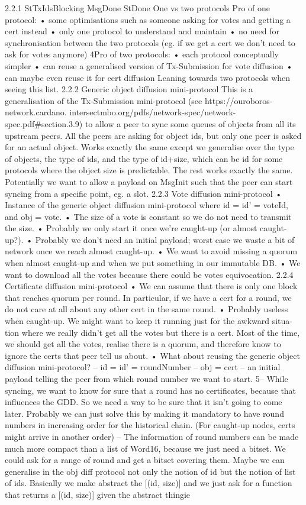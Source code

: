 2.2.1
StTxIdsBlocking
MsgDone
StDone
One vs two protocols
Pro of one protocol:
• some optimisations such as someone asking for votes and getting a cert instead
• only one protocol to understand and maintain
• no need for synchronisation between the two protocols (eg. if we get a cert we don’t need to ask
for votes anymore)
4Pro of two protocols:
• each protocol conceptually simpler
• can reuse a generalised version of Tx-Submission for vote diffusion
• can maybe even reuse it for cert diffusion
Leaning towards two protocols when seeing this list.
2.2.2
Generic object diffusion mini-protocol
This is a generalisation of the Tx-Submission mini-protocol (see https://ouroboros-network.cardano.
intersectmbo.org/pdfs/network-spec/network-spec.pdf#section.3.9) to allow a peer to sync some
queues of objects from all its upstream peers. All the peers are asking for object ids, but only one peer
is asked for an actual object.
Works exactly the same except we generalise over the type of objects, the type of ids, and the type of
id+size, which can be id for some protocols where the object size is predictable. The rest works exactly
the same.
Potentially we want to allow a payload on MsgInit such that the peer can start syncing from a specific
point, eg. a slot.
2.2.3
Vote diffusion mini-protocol
• Instance of the generic object diffusion mini-protocol where id = id’ = voteId, and obj = vote.
• The size of a vote is constant so we do not need to transmit the size.
• Probably we only start it once we’re caught-up (or almost caught-up?).
• Probably we don’t need an initial payload; worst case we waste a bit of network once we reach
almost caught-up.
• We want to avoid missing a quorum when almost caught-up and when we put something in our
immutable DB.
• We want to download all the votes because there could be votes equivocation.
2.2.4
Certificate diffusion mini-protocol
• We can assume that there is only one block that reaches quorum per round. In particular, if we
have a cert for a round, we do not care at all about any other cert in the same round.
• Probably useless when caught-up. We might want to keep it running just for the awkward situa-
tion where we really didn’t get all the votes but there is a cert. Most of the time, we should get all
the votes, realise there is a quorum, and therefore know to ignore the certs that peer tell us about.
• What about reusing the generic object diffusion mini-protocol?
– id = id’ = roundNumber
– obj = cert
– an initial payload telling the peer from which round number we want to start.
5– While syncing, we want to know for sure that a round has no certificates, because that
influences the GDD. So we need a way to be sure that it isn’t going to come later. Probably
we can just solve this by making it mandatory to have round numbers in increasing order
for the historical chain. (For caught-up nodes, certs might arrive in another order)
– The information of round numbers can be made much more compact than a list of Word16,
because we just need a bitset. We could ask for a range of round and get a bitset covering
them. Maybe we can generalise in the obj diff protocol not only the notion of id but the
notion of list of ids. Basically we make abstract the [(id, size)] and we just ask for a function
that returns a [(id, size)] given the abstract thingie
